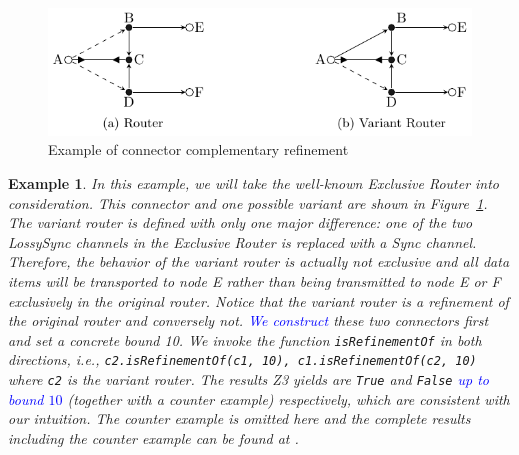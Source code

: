 \documentclass[preprint,3p]{elsarticle}
\newcommand{\liyi}[1]{\textcolor{blue}{#1}}
\newtheorem{example}{Example}[section]
\begin{document}
\begin{figure}[htb]
\centering
\includegraphics[width=.7\textwidth]{Router.pdf}
\caption{Example of connector complementary refinement }\label{fig:EXrefine}
\end{figure}
\begin{example}
In this example, we will take the well-known \emph{Exclusive Router} into consideration. This connector and one possible variant are shown in Figure~\ref{fig:EXrefine}. The \emph{variant router} is defined with only one major difference: one of the two \emph{LossySync} channels in the Exclusive Router is replaced with a \emph{Sync} channel. Therefore, the behavior of the variant router is actually not exclusive and all data items will be transported to node \emph{E} rather than being transmitted to node \emph{E} or \emph{F} exclusively in the original router. Notice that the variant router is a refinement of the original router and conversely not. \liyi{We construct} these two connectors first and set a concrete bound 10. We invoke the function \texttt{isRefinementOf} in both directions, i.e., \texttt{c2.isRefinementOf(c1, 10), c1.isRefinementOf(c2, 10)} where \texttt{c2} is the variant router. The results Z3 yields are \texttt{True} and \texttt{False} \liyi{up to bound $10$} (together with a counter example) respectively, which are consistent with our intuition.
The counter example is omitted here and the complete results including the counter example can be found at \cite{reo2coq2Z3}.
\end{example}
\end{document}
